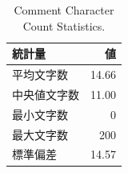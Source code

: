 \begin{table}[htbp]
  \centering
  \caption{Comment Character Count Statistics.}
  \label{tab:comment_length_statistics}
  \begin{tabular}{lr}
    \hline
    統計量 & 値 \\
    \hline
    \hline
    平均文字数 & 14.66 \\
    中央値文字数 & 11.00 \\
    最小文字数 & 0 \\
    最大文字数 & 200 \\
    標準偏差 & 14.57 \\
    \hline
  \end{tabular}
\end{table}
